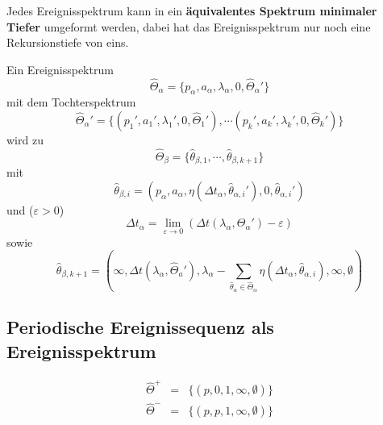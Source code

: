 \begin{tcolorbox}
    Jedes Ereignisspektrum kann in ein \textbf{äquivalentes Spektrum minimaler
    Tiefer} umgeformt werden, dabei hat das Ereignisspektrum nur noch eine
    Rekursionstiefe von eins.
\end{tcolorbox}

Ein Ereignisspektrum
\begin{equation}
    \hat{\Theta}_\alpha = \{p_\alpha, a_\alpha, \lambda_\alpha, 0, \hat{\Theta}_\alpha'\}
\end{equation}
mit dem Tochterspektrum
\begin{equation}
    \hat{\Theta}_\alpha' = \{(p_1', a_1', \lambda_1', 0, \hat{\Theta}_1'),
        \cdots (p_k', a_k', \lambda_k', 0, \hat{\Theta}_k')\}
\end{equation}
wird zu
\begin{equation}
    \hat{\Theta}_\beta = \{\hat{\theta}_{\beta, 1}, \cdots, \hat{\theta}_{\beta, k+1}\}
\end{equation}
mit
\begin{equation}
    \hat{\theta}_{\beta, i} = (p_\alpha, a_\alpha, \eta(\Delta t_\alpha, 
        \hat{\theta}_{\alpha,i}'), 0, \hat{\theta}_{\alpha, i}')
\end{equation}
und ($\varepsilon > 0$)
\begin{equation}
    \Delta t_\alpha = \lim_{\varepsilon \to 0} \left(
        \Delta t(\lambda_\alpha, \Theta_\alpha') - \varepsilon\right)
\end{equation}
sowie
\begin{equation}
    \hat{\theta}_{\beta, k+1} = \left(\infty, \Delta t(\lambda_\alpha, \hat{\Theta}_a'),
        \lambda_\alpha - \sum_{\hat{\theta}_\alpha \in \hat{\Theta}_\alpha}
        \eta(\Delta t_\alpha, \hat{\theta}_{\alpha, i}), \infty, \emptyset\right)
\end{equation}

\subsection{Periodische Ereignissequenz als Ereignisspektrum}
\begin{eqnarray}
    \hat{\Theta}^+ &=& \{(p, 0, 1, \infty, \emptyset)\} \\
    \hat{\Theta}^- &=& \{(p, p, 1, \infty, \emptyset)\}
\end{eqnarray}

